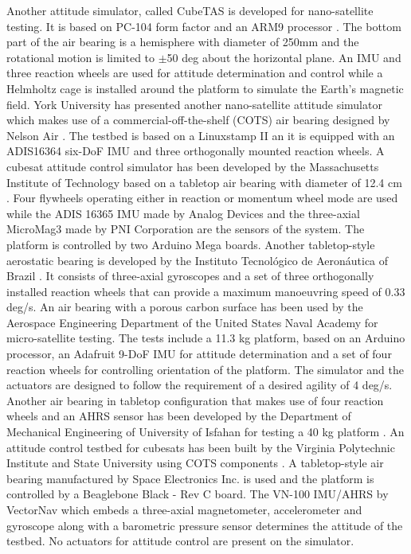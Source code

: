 \documentclass[aerospace,article,submit,moreauthors,dvi2pdf]{Definitions/mdpi}
\begin{document}
Another attitude simulator, called CubeTAS is developed for nano-satellite testing. It is based on PC-104 form factor and an ARM9 processor  \cite{14}. The bottom part of the air bearing is a hemisphere with diameter of 250mm and the rotational motion is limited to $\pm$50 deg about the horizontal plane. An IMU and three reaction wheels are used for attitude determination and control while a Helmholtz cage is installed around the platform to simulate the Earth's magnetic field. 
York University has presented another nano-satellite attitude simulator which makes use of a commercial-off-the-shelf (COTS) air bearing designed by Nelson Air \cite{27}. The testbed is based on a Linuxstamp II an it is equipped with an ADIS16364 six-DoF IMU and three orthogonally mounted reaction wheels.
A cubesat attitude control simulator has been developed by the Massachusetts Institute of Technology based on a tabletop air bearing with diameter of 12.4 cm \cite{58}. Four flywheels operating either in reaction or momentum wheel mode are used while the ADIS 16365 IMU made by Analog Devices and the three-axial MicroMag3 made by PNI Corporation are the sensors of the system. The platform is controlled by two Arduino Mega boards.
Another tabletop-style aerostatic bearing is developed by the Instituto Tecnológico de Aeronáutica of Brazil \cite{39}. It consists of three-axial gyroscopes and a set of three orthogonally installed reaction wheels that can provide a maximum manoeuvring speed of 0.33 deg/s.
An air bearing with a porous carbon surface has been used by the Aerospace Engineering Department of the United States Naval Academy \cite{15} for micro-satellite testing. The tests include a 11.3 kg platform, based on an Arduino processor, an Adafruit 9-DoF IMU for attitude determination and a set of four reaction wheels for controlling orientation of the platform. The simulator and the actuators are designed to follow the requirement of a desired agility of 4 deg/s.
Another air bearing in tabletop configuration that makes use of four reaction wheels and an AHRS sensor has been developed by the Department of Mechanical Engineering of University of Isfahan for testing a 40 kg platform \cite{21}.
An attitude control testbed for cubesats has been built by the Virginia Polytechnic Institute and State University using COTS components \cite{13}. A tabletop-style air bearing manufactured by Space Electronics Inc. is used and the platform is controlled by a Beaglebone Black - Rev C board.  The VN-100 IMU/AHRS by VectorNav which embeds a three-axial magnetometer, accelerometer and gyroscope along with a barometric pressure sensor determines the attitude of the testbed. No actuators for attitude control are present on the simulator.
\end{document}

